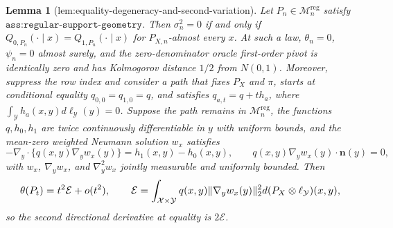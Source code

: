 \documentclass{article}
\newtheorem{lemma}{Lemma}
\begin{document}
\begin{lemma}[lem:equality-degeneracy-and-second-variation]\label{lem:equality-degeneracy-and-second-variation}
Let \(P_n\in\mathcal M_n^{\mathrm{reg}}\) satisfy \(\texttt{ass:regular-support-geometry}\). Then \(\sigma_n^2=0\) if and only if \(Q_{0,P_n}(\cdot\mid x)=Q_{1,P_n}(\cdot\mid x)\) for \(P_{X,n}\)-almost every \(x\). At such a law, \(\theta_n=0\), \(\psi_n=0\) almost surely, and the zero-denominator oracle first-order pivot is identically zero and has Kolmogorov distance \(1/2\) from \(N(0,1)\). Moreover, suppress the row index and consider a path that fixes \(P_X\) and \(\pi\), starts at conditional equality \(q_{0,0}=q_{1,0}=q\), and satisfies \(q_{a,t}=q+t h_a\), where \(\int_{\mathcal Y}h_a(x,y)d\ell_{\mathcal Y}(y)=0\). Suppose the path remains in \(\mathcal M_n^{\mathrm{reg}}\), the functions \(q,h_0,h_1\) are twice continuously differentiable in \(y\) with uniform bounds, and the mean-zero weighted Neumann solution \(w_x\) satisfies
\[
-\nabla_y\cdot\{q(x,y)\nabla_yw_x(y)\}=h_1(x,y)-h_0(x,y),\qquad q(x,y)\nabla_yw_x(y)\cdot\mathbf n(y)=0,
\]
with \(w_x\), \(\nabla_yw_x\), and \(\nabla_y^2w_x\) jointly measurable and uniformly bounded. Then
\[
\makebox[\linewidth][c]{\resizebox{0.98\linewidth}{!}{\par\noindent \makebox[\linewidth][c]{\resizebox{0.98\linewidth}{!}{\(\displaystyle \displaystyle \theta(P_t)=t^2\mathcal E+o(t^2),\qquad \mathcal E=\int_{\mathcal X\times\mathcal Y}q(x,y)\lVert\nabla_yw_x(y)\rVert_2^2d(P_X\otimes\ell_{\mathcal Y})(x,y),\)}}\par\noindent}}
\]
so the second directional derivative at equality is \(2\mathcal E\).
\end{lemma}
\end{document}

